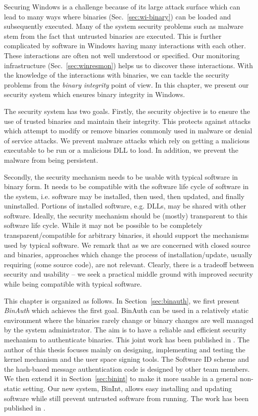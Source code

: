 
Securing Windows is a challenge because of its large
attack surface which can lead to many ways where
binaries (Sec.~\ref{sec:wi-binary}) can be loaded and subsequently executed.
Many of the system security problems such as malware
stem from the fact that untrusted binaries are executed.
This is further complicated by
software in Windows having many interactions with each other.
These interactions are often not well understood or specified.
Our monitoring infrastructure (Sec.~\ref{sec:winresmon}) helps
us to discover these interactions.
With the knowledge of the interactions with binaries,
we can tackle the security problems from the {\em binary integrity}
point of view.
In this chapter, we present our security system which ensures
binary integrity in Windows.

The security system has two goals. Firstly, the security objective
is to ensure the use of trusted binaries and maintain their integrity.
This protects against attacks which attempt to modify or remove binaries
commonly used in malware or denial of service attacks.
We prevent malware attacks which rely on
getting a malicious executable to be run or
a malicious DLL to load.
In addition, we prevent the malware from being persistent.

Secondly, the security mechanism needs to be usable with typical
software in binary form.
It needs to be compatible with the software life cycle of software in the
system, i.e.
software may be installed, then used, then updated, and 
finally uninstalled. 
Portions of installed software, e.g. DLLs,
may be shared with other software. 
Ideally, the security mechanism should be (mostly) transparent to 
this software life cycle.
While it may not be possible to be completely transparent/compatible 
for arbitrary binaries, it should support the mechanisms used 
by typical software.
We remark that as we are concerned with
closed source and binaries,
approaches which change the process of installation/update,
usually requiring (some source code), are not relevant.
Clearly, there is a tradeoff between security and usability --
we seek a practical middle ground with improved security while
being compatible with typical software.

This chapter is organized as follows.
In Section~\ref{sec:binauth},
we first present {\em BinAuth} which achieves the first goal.
BinAuth can be used in a relatively static environment where the binaries 
rarely change or binary changes are well managed by the system administrator.
The aim is to have a reliable and efficient security mechanism
to authenticate binaries.
This joint work has been published in \cite{halim2008lightweight,wu2009esi}.
The author of this thesis focuses mainly on designing, implementing and testing
the kernel mechanism and the user space signing tools.
The Software ID scheme and the hash-based message authentication code
is designed by other team members.
We then extend it in Section~\ref{sec:binint} to make it more usable
in a general non-static setting.
Our new system, BinInt, allows easy installing and updating software
while still prevent untrusted software from running.
The work has been published in \cite{wu2011towards}.
